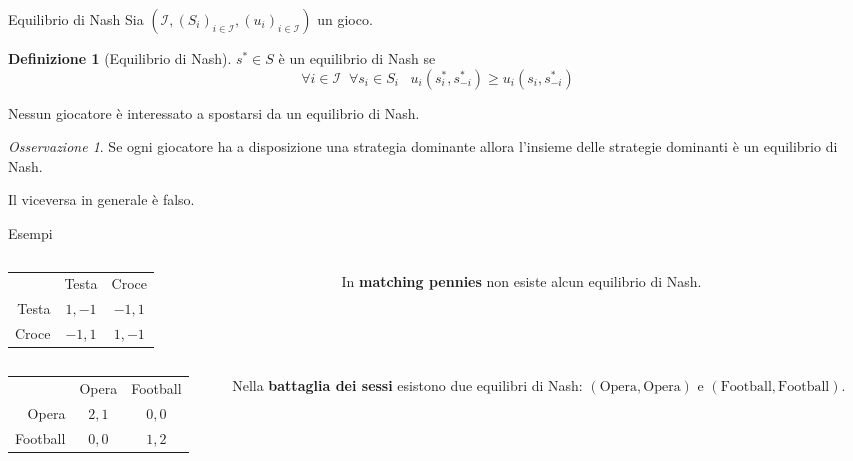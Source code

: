 \documentclass{beamer}
\newcounter{counter1}
\theoremstyle{plain}
\theoremstyle{definition}
\newtheorem{mydef}[counter1]{Definizione}
\theoremstyle{remark}
\newtheorem{myoss}[counter1]{Osservazione}
\newcommand{\pa}[1]{\left(#1\right)}
\begin{document}
\begin{frame}{Equilibrio di Nash}
  Sia  $\pa{\mathcal{I},\pa{S_i}_{i\in\mathcal{I}},
    \pa{u_i}_{i\in\mathcal{I}}}$ un gioco.
  \begin{mydef}[Equilibrio di Nash]
    $s^* \in S$ è un equilibrio di Nash se
    \[ \forall i\in \mathcal{I}\;\; \forall s_i \in S_i \;\;\;
      u_i\pa{s^*_i,s^*_{-i}} \ge u_i\pa{s_i,s^*_{-i}} \]
  \end{mydef}

  Nessun giocatore è interessato a spostarsi da un equilibrio di Nash.

  \begin{myoss}
    Se ogni giocatore ha a disposizione una strategia dominante allora
    l'insieme delle strategie dominanti è un equilibrio di Nash.

    Il viceversa in generale è falso.
  \end{myoss}
\end{frame}

\begin{frame}{Esempi}
  \begin{columns}[T]
    \begin{column}{0.45\textwidth}
      \begin{tabular}{rcc}
        & Testa & Croce \\
        \cline{2-3}
        Testa & \multicolumn{1}{|c|}{$1,-1$} & \multicolumn{1}{|c|}{$-1,1$}  \\
        \cline{2-3}
        Croce & \multicolumn{1}{|c|}{$-1,1$} & \multicolumn{1}{|c|}{$1,-1$}  \\
        \cline{2-3}
      \end{tabular}
    \end{column}
    \begin{column}{0.45\textwidth}
      In \textbf{matching pennies} non esiste alcun equilibrio di Nash.
    \end{column}
  \end{columns}
  \vfill
  
  \begin{columns}[T]
    \begin{column}{0.45\textwidth}
      \begin{tabular}{rcc}
        & Opera & Football \\
        \cline{2-3}
        Opera & \multicolumn{1}{|c|}{$2,1$} & \multicolumn{1}{|c|}{$0,0$}  \\
        \cline{2-3}
        Football & \multicolumn{1}{|c|}{$0,0$} & \multicolumn{1}{|c|}{$1,2$}  \\
        \cline{2-3}
      \end{tabular}
    \end{column}
    \begin{column}{0.45\textwidth}
      Nella \textbf{battaglia dei sessi} esistono due equilibri di
      Nash: $\pa{\text{Opera},\text{Opera}}$ e
      $\pa{\text{Football},\text{Football}}$.
    \end{column}
  \end{columns}
\end{frame}
\end{document}
